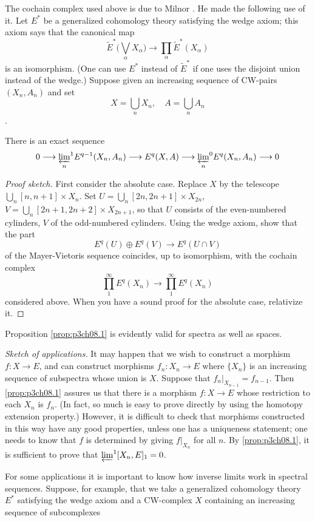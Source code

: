 \documentclass[../main]{subfiles}
\begin{document}
\par The cochain complex used above is due to Milnor \cite{Milnor3}. He made the following use of it. Let $E^*$ be a generalized cohomology theory satisfying the wedge axiom; this axiom says that the canonical map 
\[\tilde{E}^*\bigg(\bigvee_\alpha X_\alpha\bigg)\longrightarrow \prod_\alpha \tilde{E}^*(X_\alpha)\]
is an isomorphism. (One can use $E^*$ instead of $\tilde{E}^*$ if one uses the disjoint union instead of the wedge.) Suppose given an increasing sequence of CW-pairs $(X_n,A_n)$ and set
\[X=\bigcup_n X_n, \quad A=\bigcup_n A_n\].
\begin{proposition}[Milnor] \label{prop:p3ch08.1}
    There is an exact sequence
    \[0\longrightarrow {\varprojlim_n}^1E^{q-1}(X_n,A_n)\longrightarrow E^q(X,A)\longrightarrow {\varprojlim_n}^0E^q(X_n,A_n)\longrightarrow 0\]
\end{proposition}
\begin{proof}[Proof sketch]
First consider the absolute case. Replace $X$ by the telescope\newline $\bigcup_n[n,n+1]\times X_n$. Set $U=\bigcup_n[2n,2n+1]\times X_{2n}$, $V=\bigcup_n[2n+1,2n+2]\times X_{2n+1}$, so that $U$ consists of the even-numbered cylinders, $V$ of the odd-numbered cylinders. Using the wedge axiom, show that the part 
\[E^q(U)\oplus E^q(V)\longrightarrow E^q(U\cap V)\]
of the Mayer-Vietoris sequence coincides, up to isomorphism, with the cochain complex
\[\prod_1^\infty E^q(X_n) \longrightarrow \prod_1^\infty E^q(X_n)\]
considered above. When you have a sound proof for the absolute case, relativize it.
\end{proof}
Proposition \ref{prop:p3ch08.1} is evidently valid for spectra as well as spaces.
\par \emph{Sketch of applications.} It may happen that we wish to construct a morphism $f:X\longrightarrow E$, and can construct morphisms $f_n:X_n\longrightarrow E$ where $\{X_n\}$ is an increasing sequence of subspectra whose union is $X$. Suppose that $f_n|_{X_{n-1}} = f_{n-1}$. Then \ref{prop:p3ch08.1} assures us that there is a morphism $f:X\longrightarrow E$ whose restriction to each $X_n$ is $f_n$. (In fact, so much is easy to prove directly by using the homotopy extension property.) However, it is difficult to check that morphisms constructed in this way have any good properties, unless one has a uniqueness statement; one needs to know that $f$ is determined by giving $f|_{X_n}$ for all $n$. By \ref{prop:p3ch08.1}, it is sufficient to prove that ${\varprojlim}^1[X_n,E]_1=0$.
\par For some applications it is important to know how inverse limits work in spectral sequences. Suppose, for example, that we take a generalized cohomology theory $E^*$ satisfying the wedge axiom and a CW-complex $X$ containing an increasing sequence of subcomplexes
\end{document}
